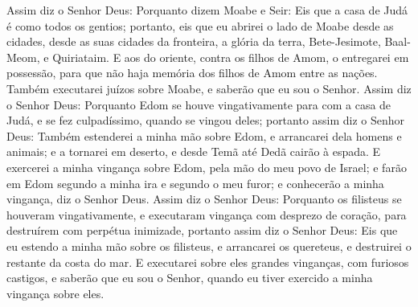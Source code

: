 Assim diz o Senhor Deus: Porquanto dizem Moabe e Seir: Eis que a
casa de Judá é como todos os gentios; portanto, eis que eu
abrirei o lado de Moabe desde as cidades, desde as suas cidades da
fronteira, a glória da terra, Bete-Jesimote, Baal-Meom, e
Quiriataim. E aos do oriente, contra os filhos de Amom, o
entregarei em possessão, para que não haja memória dos filhos de
Amom entre as nações. Também executarei juízos sobre Moabe, e
saberão que eu sou o Senhor. Assim diz o Senhor Deus:
Porquanto Edom se houve vingativamente para com a casa de Judá, e se
fez culpadíssimo, quando se vingou deles; portanto assim diz
o Senhor Deus: Também estenderei a minha mão sobre Edom, e
arrancarei dela homens e animais; e a tornarei em deserto, e desde
Temã até Dedã cairão à espada. E exercerei a minha vingança
sobre Edom, pela mão do meu povo de Israel; e farão em Edom segundo
a minha ira e segundo o meu furor; e conhecerão a minha vingança,
diz o Senhor Deus. Assim diz o Senhor Deus: Porquanto os
filisteus se houveram vingativamente, e executaram vingança com
desprezo de coração, para destruírem com perpétua inimizade,
portanto assim diz o Senhor Deus: Eis que eu estendo a minha
mão sobre os filisteus, e arrancarei os quereteus, e destruirei o
restante da costa do mar. E executarei sobre eles grandes
vinganças, com furiosos castigos, e saberão que eu sou o Senhor,
quando eu tiver exercido a minha vingança sobre eles.

\medskip

